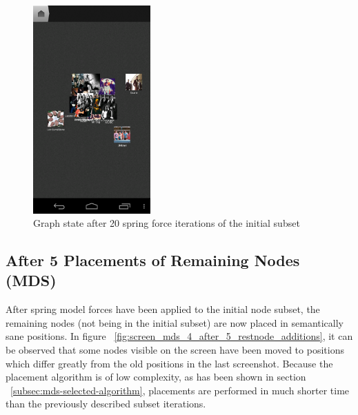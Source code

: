 \begin{figure}[H]
  \centering
    \includegraphics[width=0.4\textwidth]{figures/screen_mds_3_after_20_subset_iterations}
  \caption{Graph state after 20 spring force iterations of the initial subset}
  \label{fig:screen_mds_3_after_20_subset_iterations}
\end{figure}

\newpage
\subsection{After 5 Placements of Remaining Nodes (MDS)}

After spring model forces have been applied to the initial node subset, the remaining nodes (not being in the initial subset) are now placed in semantically sane positions. In figure ~\ref{fig:screen_mds_4_after_5_restnode_additions}, it can be observed that some nodes visible on the screen have been moved to positions which differ greatly from the old positions in the last screenshot. Because the placement algorithm is of low complexity, as has been shown in section ~\ref{subsec:mds-selected-algorithm}, placements are performed in much shorter time than the previously described subset iterations.

